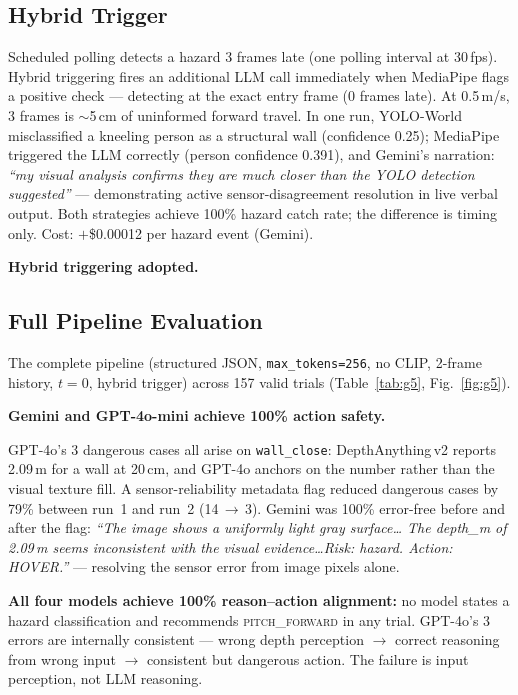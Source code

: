 \documentclass[journal]{IEEEtran}
\begin{document}
\subsection{Hybrid Trigger}

Scheduled polling detects a hazard 3 frames late (one polling
interval at 30\,fps).
Hybrid triggering fires an additional LLM call immediately when
MediaPipe flags a positive check --- detecting at the exact entry
frame (0 frames late).
At 0.5\,m/s, 3 frames is $\sim$5\,cm of uninformed forward travel.
In one run, YOLO-World misclassified a kneeling person as a
structural wall (confidence 0.25); MediaPipe triggered the LLM
correctly (person confidence 0.391), and Gemini's narration:
\emph{``my visual analysis confirms they are much closer than the
YOLO detection suggested''} --- demonstrating active
sensor-disagreement resolution in live verbal output.
Both strategies achieve 100\% hazard catch rate; the difference is
timing only.
Cost: $+$\$0.00012 per hazard event (Gemini).

\textbf{Hybrid triggering adopted.}

\subsection{Full Pipeline Evaluation}
\label{sec:full_pipeline}

The complete pipeline (structured JSON, \texttt{max\_tokens=256},
no CLIP, 2-frame history, $t=0$, hybrid trigger) across 157 valid
trials (Table~\ref{tab:g5}, Fig.~\ref{fig:g5}).

\textbf{Gemini and GPT-4o-mini achieve 100\% action safety.}

GPT-4o's 3 dangerous cases all arise on \texttt{wall\_close}:
DepthAnything\,v2 reports 2.09\,m for a wall at 20\,cm, and
GPT-4o anchors on the number rather than the visual texture fill.
A sensor-reliability metadata flag reduced dangerous cases by 79\%
between run~1 and run~2 (14\,$\to$\,3).
Gemini was 100\% error-free before and after the flag:
\emph{``The image shows a uniformly light gray surface\ldots
The depth\_m of 2.09\,m seems inconsistent with the visual
evidence\ldots Risk: hazard. Action: HOVER.''} --- resolving the
sensor error from image pixels alone.

\textbf{All four models achieve 100\% reason--action alignment:}
no model states a hazard classification and recommends
\textsc{pitch\_forward} in any trial.
GPT-4o's 3 errors are internally consistent --- wrong depth
perception $\to$ correct reasoning from wrong input $\to$
consistent but dangerous action.
The failure is input perception, not LLM reasoning.
\end{document}

